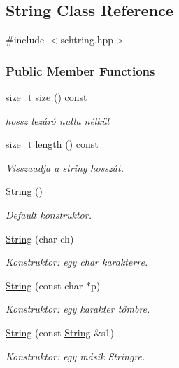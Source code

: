 \subsection{String Class Reference}
\label{class_string}


{\ttfamily \#include $<$schtring.\+hpp$>$}

\subsubsection*{Public Member Functions}
\begin{DoxyCompactItemize}
\item 
size\+\_\+t \mbox{\hyperlink{class_string_a588c5cc9faededbb9d938662d354feed}{size}} () const
\begin{DoxyCompactList}\small\item\em hossz lezáró nulla nélkül \end{DoxyCompactList}\item 
size\+\_\+t \mbox{\hyperlink{class_string_ad3b888edbfb3bab21d4bae4663d2211a}{length}} () const
\begin{DoxyCompactList}\small\item\em Visszaadja a string hosszát. \end{DoxyCompactList}\item 
\mbox{\hyperlink{class_string_a8a7ef356e05eb9b1ea1ab518baee3095}{String}} ()
\begin{DoxyCompactList}\small\item\em Default konstruktor. \end{DoxyCompactList}\item 
\mbox{\hyperlink{class_string_a62a77180f8df2547e8be1313654abcee}{String}} (char ch)
\begin{DoxyCompactList}\small\item\em Konstruktor\+: egy char karakterre. \end{DoxyCompactList}\item 
\mbox{\hyperlink{class_string_a09ca4f1436a83ecb1c273a836b7cd4c6}{String}} (const char $\ast$p)
\begin{DoxyCompactList}\small\item\em Konstruktor\+: egy karakter tömbre. \end{DoxyCompactList}\item 
\mbox{\hyperlink{class_string_a3c682dc983b45bdbb7f3858fe4cbf221}{String}} (const \mbox{\hyperlink{class_string}{String}} \&s1)
\begin{DoxyCompactList}\small\item\em Konstruktor\+: egy másik Stringre. \end{DoxyCompactList}\item 

\end{DoxyCompactItemize}
